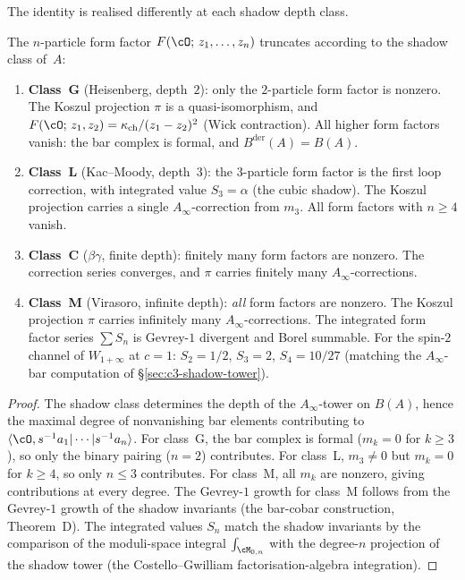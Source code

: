 The identity is realised differently at each shadow depth class.

\begin{proposition}
\label{prop:ff-truncation-by-class}
The $n$-particle form factor $F(\cO;\, z_1, \ldots, z_n)$ truncates according to the shadow class of~$A$:
\begin{enumerate}[label=(\roman*)]
 \item \textbf{Class~G} \textup{(}Heisenberg, depth~$2$\textup{)}: only the $2$-particle form factor is nonzero. The Koszul projection $\pi$ is a quasi-isomorphism, and $F(\cO;\, z_1, z_2) = \kappa_{\mathrm{ch}} / (z_1 - z_2)^2$ \textup{(}Wick contraction\textup{)}. All higher form factors vanish: the bar complex is formal, and $B^{\mathrm{der}}(A) = B(A)$.

 \item \textbf{Class~L} \textup{(}Kac--Moody, depth~$3$\textup{)}: the $3$-particle form factor is the first loop correction, with integrated value $S_3 = \alpha$ \textup{(}the cubic shadow\textup{)}. The Koszul projection carries a single $A_\infty$-correction from $m_3$. All form factors with $n \geq 4$ vanish.

 \item \textbf{Class~C} \textup{(}$\beta\gamma$, finite depth\textup{)}: finitely many form factors are nonzero. The correction series converges, and $\pi$ carries finitely many $A_\infty$-corrections.

 \item \textbf{Class~M} \textup{(}Virasoro, infinite depth\textup{)}: \emph{all} form factors are nonzero. The Koszul projection $\pi$ carries infinitely many $A_\infty$-corrections. The integrated form factor series $\sum S_n$ is Gevrey-$1$ divergent and Borel summable. For the spin-$2$ channel of $W_{1+\infty}$ at $c = 1$: $S_2 = 1/2$, $S_3 = 2$, $S_4 = 10/27$ \textup{(}matching the $A_\infty$-bar computation of \S\ref{sec:c3-shadow-tower}\textup{)}.
\end{enumerate}
\end{proposition}

\begin{proof}
The shadow class determines the depth of the $A_\infty$-tower on $B(A)$, hence the maximal degree of nonvanishing bar elements contributing to $\langle \cO, s^{-1}a_1 | \cdots | s^{-1}a_n \rangle$. For class~G, the bar complex is formal ($m_k = 0$ for $k \geq 3$), so only the binary pairing ($n = 2$) contributes. For class~L, $m_3 \neq 0$ but $m_k = 0$ for $k \geq 4$, so only $n \leq 3$ contributes. For class~M, all $m_k$ are nonzero, giving contributions at every degree. The Gevrey-$1$ growth for class~M follows from the Gevrey-$1$ growth of the shadow invariants (the bar-cobar construction, Theorem~D). The integrated values $S_n$ match the shadow invariants by the comparison of the moduli-space integral $\int_{\cM_{0,n}}$ with the degree-$n$ projection of the shadow tower (the Costello--Gwilliam factorisation-algebra integration).
\end{proof}

